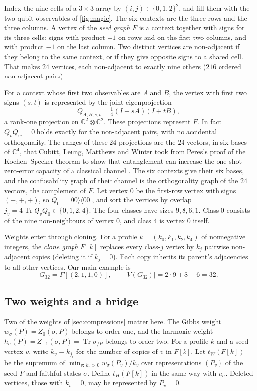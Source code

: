 \documentclass[11pt]{article}
\theoremstyle{definition}
\DeclareMathOperator{\Tr}{Tr}
\newcommand{\ket}[1]{\lvert #1\rangle}
\newcommand{\bra}[1]{\langle #1\rvert}
\newcommand{\proj}[1]{\ket{#1}\!\bra{#1}}
\begin{document}
Index the nine cells of a $3\times3$ array by $(i,j)\in\{0,1,2\}^2$, and fill
them with the two-qubit observables of \cref{fig:magic}.  The six contexts are
the three rows and the three columns.  A vertex of the \emph{seed graph} $F$
is a context together with signs for its three cells: signs with product $+1$
on rows and on the first two columns, and with product $-1$ on the last
column.  Two distinct vertices are non-adjacent if they belong to the same
context, or if they give opposite signs to a shared cell.  That makes
$24$ vertices, each non-adjacent to exactly nine others ($216$ ordered
non-adjacent pairs).

For a context whose first two observables are $A$ and $B$, the vertex with
first two signs $(s,t)$ is represented by the joint eigenprojection
\[
 Q_{A,B;s,t}=\tfrac14(I+sA)(I+tB),
\]
a rank-one projection on $\mathbb C^2\otimes\mathbb C^2$.  These projections
represent $F$.  In fact $Q_vQ_w=0$ holds exactly for the non-adjacent pairs,
with no accidental orthogonality.  The ranges of these $24$ projections are
the $24$ vectors, in six bases of $\mathbb C^4$, that Cubitt, Leung, Matthews
and Winter took from Peres's proof of the Kochen--Specker theorem to show
that entanglement can increase the one-shot zero-error capacity of a
classical channel \cite[Fig.~2]{CLMW2010}.  The six contexts give their six
bases, and the confusability graph of their channel is the orthogonality
graph of the $24$ vectors, the complement of $F$.  Let vertex $0$ be the
first-row vertex
with signs $(+,+,+)$, so $Q_0=\proj{00}$, and sort the vertices by overlap
$j_v=4\Tr Q_vQ_0\in\{0,1,2,4\}$.  The four classes have sizes $9,8,6,1$.
Class $0$ consists of the nine non-neighbours of vertex $0$, and class $4$ is
vertex $0$ itself.

Weights enter through cloning.  For a profile $k=(k_0,k_1,k_2,k_4)$ of
nonnegative integers, the \emph{clone graph} $F[k]$ replaces every class-$j$
vertex by $k_j$ pairwise non-adjacent copies (deleting it if $k_j=0$).  Each
copy inherits its parent's adjacencies to all other vertices.  Our main
example is
\[
 G_{32}=F[(2,1,1,0)],\qquad |V(G_{32})|=2\cdot9+8+6=32 .
\]

\subsection{Two weights and a bridge}

Two of the weights of \cref{sec:compressions} matter here.  The Gibbs weight
$w_\sigma(P)=Z_0(\sigma,P)$ belongs to order one, and the harmonic weight
$h_\sigma(P)=Z_{-1}(\sigma,P)=\Tr\sigma_{/P}$ belongs to order two.  For a
profile $k$ and a seed vertex $v$, write $k_v=k_{j_v}$ for the number of
copies of $v$ in $F[k]$.  Let $t_W(F[k])$ be the supremum of
$\min_{v:\,k_v>0}w_\sigma(P_v)/k_v$ over representations $(P_v)$ of the seed
$F$ and faithful states $\sigma$.  Define $t_H(F[k])$ in the same way with
$h_\sigma$.  Deleted vertices, those with $k_v=0$, may be represented by
$P_v=0$.
\end{document}
